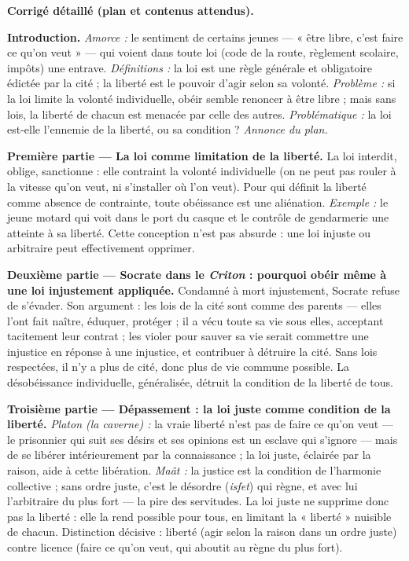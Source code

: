 \documentclass[11pt]{article}
\begin{document}
\begin{corrige}
\textbf{Corrigé détaillé (plan et contenus attendus).}

\medskip
\textbf{Introduction.} \emph{Amorce :} le sentiment de certains jeunes — « être libre, c'est faire ce qu'on veut » — qui voient dans toute loi (code de la route, règlement scolaire, impôts) une entrave. \emph{Définitions :} la loi est une règle générale et obligatoire édictée par la cité ; la liberté est le pouvoir d'agir selon sa volonté. \emph{Problème :} si la loi limite la volonté individuelle, obéir semble renoncer à être libre ; mais sans lois, la liberté de chacun est menacée par celle des autres. \emph{Problématique :} la loi est-elle l'ennemie de la liberté, ou sa condition ? \emph{Annonce du plan.}

\medskip
\textbf{Première partie — La loi comme limitation de la liberté.} La loi interdit, oblige, sanctionne : elle contraint la volonté individuelle (on ne peut pas rouler à la vitesse qu'on veut, ni s'installer où l'on veut). Pour qui définit la liberté comme absence de contrainte, toute obéissance est une aliénation. \emph{Exemple :} le jeune motard qui voit dans le port du casque et le contrôle de gendarmerie une atteinte à sa liberté. Cette conception n'est pas absurde : une loi injuste ou arbitraire peut effectivement opprimer.

\medskip
\textbf{Deuxième partie — Socrate dans le \emph{Criton} : pourquoi obéir même à une loi injustement appliquée.} Condamné à mort injustement, Socrate refuse de s'évader. Son argument : les lois de la cité sont comme des parents — elles l'ont fait naître, éduquer, protéger ; il a vécu toute sa vie sous elles, acceptant tacitement leur contrat ; les violer pour sauver sa vie serait commettre une injustice en réponse à une injustice, et contribuer à détruire la cité. Sans lois respectées, il n'y a plus de cité, donc plus de vie commune possible. La désobéissance individuelle, généralisée, détruit la condition de la liberté de tous.

\medskip
\textbf{Troisième partie — Dépassement : la loi juste comme condition de la liberté.} \emph{Platon (la caverne) :} la vraie liberté n'est pas de faire ce qu'on veut — le prisonnier qui suit ses désirs et ses opinions est un esclave qui s'ignore — mais de se libérer intérieurement par la connaissance ; la loi juste, éclairée par la raison, aide à cette libération. \emph{Maât :} la justice est la condition de l'harmonie collective ; sans ordre juste, c'est le désordre (\emph{isfet}) qui règne, et avec lui l'arbitraire du plus fort — la pire des servitudes. La loi juste ne supprime donc pas la liberté : elle la rend possible pour tous, en limitant la « liberté » nuisible de chacun. Distinction décisive : liberté (agir selon la raison dans un ordre juste) contre licence (faire ce qu'on veut, qui aboutit au règne du plus fort).


\end{corrige}
\end{document}
